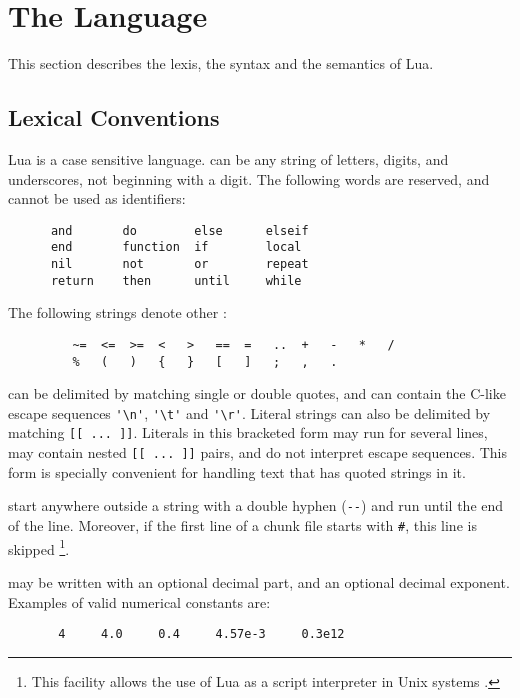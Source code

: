 \section{The Language}

This section describes the lexis, the syntax and the semantics of Lua.


\subsection{Lexical Conventions} \label{lexical}

Lua is a case sensitive language.
 can be any string of letters, digits, and underscores,
not beginning with a digit.
The following words are reserved, and cannot be used as identifiers:
\begin{verbatim}
      and       do        else      elseif
      end       function  if        local
      nil       not       or        repeat
      return    then      until     while
\end{verbatim}

The following strings denote other :
\begin{verbatim}
         ~=  <=  >=  <   >   ==  =   ..  +   -   *   /
         %   (   )   {   }   [   ]   ;   ,   .
\end{verbatim}

 can be delimited by matching single or double quotes,
and can contain the C-like escape sequences
\verb-'\n'-, \verb-'\t'- and \verb-'\r'-.
Literal strings can also be delimited by matching \verb'[[ ... ]]'.
Literals in this bracketed form may run for several lines,
may contain nested \verb'[[ ... ]]' pairs,
and do not interpret escape sequences.
This form is specially convenient for
handling text that has quoted strings in it.

 start anywhere outside a string with a
double hyphen (\verb'--') and run until the end of the line.
Moreover, if the first line of a chunk file starts with \verb'#',
this line is skipped%
\footnote{This facility allows the use of Lua as a script interpreter
in Unix systems .}.

 may be written with an optional decimal part,
and an optional decimal exponent.
Examples of valid numerical constants are:
\begin{verbatim}
       4     4.0     0.4     4.57e-3     0.3e12
\end{verbatim}


